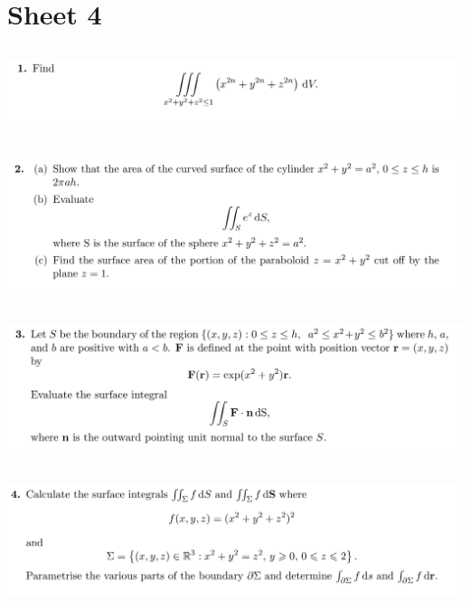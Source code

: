 \newpage
\section{Sheet 4}

\subsection{}
\begin{mdframed}
  \includegraphics[width=400pt]{img/oxford-prelims-M5-multivariable-calc-4-1.png}
\end{mdframed}

\subsection{}
\begin{mdframed}
  \includegraphics[width=400pt]{img/oxford-prelims-M5-multivariable-calc-4-2.png}
\end{mdframed}

\subsection{}
\begin{mdframed}
  \includegraphics[width=400pt]{img/oxford-prelims-M5-multivariable-calc-4-3.png}
\end{mdframed}

\subsection{}
\begin{mdframed}
  \includegraphics[width=400pt]{img/oxford-prelims-M5-multivariable-calc-4-4.png}
\end{mdframed}


